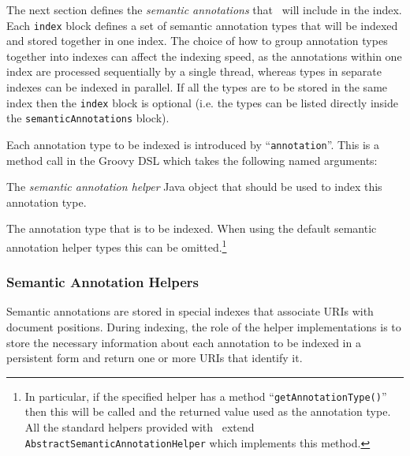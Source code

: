 The next section defines the {\em semantic annotations} that \Mimir\ will
include in the index.  Each \lstinline!index! block defines a set of semantic
annotation types that will be indexed and stored together in one index.  The
choice of how to group annotation types together into indexes can affect the
indexing speed, as the annotations within one index are processed sequentially
by a single thread, whereas types in separate indexes can be indexed in
parallel.  If all the types are to be stored in the same index then the
\lstinline!index! block is optional (i.e. the types can be listed directly
inside the \lstinline!semanticAnnotations! block).

Each annotation type to be indexed is introduced by ``{\tt annotation}''.  This
is a method call in the Groovy DSL which takes the following named arguments:
\bde
\item[helper] The {\em semantic annotation helper} Java object that should be
  used to index this annotation type.
\item[type] The annotation type that is to be indexed.  When using the default
  semantic annotation helper types this can be omitted.\footnote{In particular,
  if the specified helper has a method ``{\tt getAnnotationType()}'' then this
  will be called and the returned value used as the annotation type.  All the
  standard helpers provided with \Mimir\ extend
  {\tt AbstractSemanticAnnotationHelper} which implements this method.}
\ede

\subsubsection{Semantic Annotation Helpers}

Semantic annotations are stored in special indexes that associate URIs with
document positions. During indexing, the role of the helper implementations is 
to store the necessary information about each annotation to be indexed in a
persistent form and return one or more URIs that identify it.


